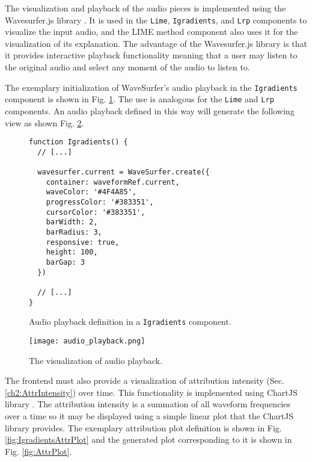 \documentclass[
    bindingoffset=5mm,  %
    footnoteindent=3mm, %
    hyphenation=true    %
]{src/wut-thesis}
\begin{document}
The visualization and playback of the audio pieces is implemented using the Wavesurfer.js
library \cite{WavesurferDOC}. It is used in the \texttt{Lime}, \texttt{Igradients}, and \texttt{Lrp}
components to visualize the input audio, and the LIME method component also uses it for the
visualization of its explanation. The advantage of the Wavesurfer.js library is that it
provides interactive playback functionality meaning that a user may listen to the original
audio and select any moment of the audio to listen to.

The exemplary initialization of WaveSurfer's audio playback in the \texttt{Igradients} component is shown
in Fig. \ref{fig:IgradientsAudioPlayback}. The use is analogous for the \texttt{Lime} and \texttt{Lrp} components.
An audio playback defined in this way will generate the following view as shown Fig. \ref{fig:AudioPlayback}.

\begin{figure}%
\begin{verbatim}
function Igradients() {
  // [...]

  wavesurfer.current = WaveSurfer.create({
    container: waveformRef.current,
    waveColor: '#4F4A85',
    progressColor: '#383351',
    cursorColor: '#383351',
    barWidth: 2,
    barRadius: 3,
    responsive: true,
    height: 100,
    barGap: 3
  })

  // [...]
}
\end{verbatim}
\caption{Audio playback definition in a \texttt{Igradients} component.}
\label{fig:IgradientsAudioPlayback}
\end{figure}

\begin{figure}[h!] %
    \centering
    \texttt{[image: audio\_playback.png]}
    \caption{The visualization of audio playback.}
    \label{fig:AudioPlayback}
\end{figure}


The frontend must also provide a visualization of attribution intensity (Sec. \ref{ch2:AttrIntensity}) over time.
This functionality is implemented using ChartJS library \cite{ChartJsDoc}.
The attribution intensity is a summation of all waveform frequencies over a time so it may
be displayed using a simple linear plot that the ChartJS library provides.
The exemplary attribution plot definition is shown in Fig. \ref{fig:IgradientsAttrPlot}
and the generated plot corresponding to it is shown in Fig. \ref{fig:AttrPlot}.
\end{document}
